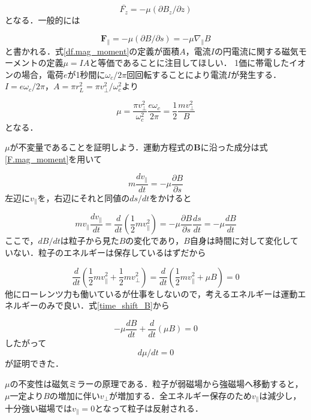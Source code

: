 \documentclass{ltjsarticle}
\numberwithin{equation}{section} %
\numberwithin{equation}{section}
\begin{document}
\begin{equation}
  \bar{F_z} = -\mu (\partial B_z / \partial z)
\end{equation}
となる．一般的には

\begin{equation}
  \bm{F}_\parallel = -\mu (\partial B /\partial s) = -\mu \nabla_\parallel B \label{F.mag_moment}
\end{equation}
と書かれる．式\eqref{df.mag_moment}の定義が面積$A$，電流$I$の円電流に関する磁気モーメントの定義$\mu= IA$と等価であることに注目してほしい．
1価に帯電したイオンの場合，電荷$e$が1秒間に$\omega_c/2\pi$回回転することにより電流$I$が発生する．$I=e\omega_c/2\pi$，$A=\pi r_L ^2 = \pi v_\perp ^2/\omega_c ^2$より

\[
 \mu = \frac{\pi v_\perp ^2}{\omega_c ^2}\frac{e\omega_c}{2\pi} = \frac{1}{2}\frac{mv_\perp ^2}{B}
\]
となる．

$\mu$が不変量であることを証明しよう．運動方程式の$\bm{B}$に沿った成分は式\eqref{F.mag_moment}を用いて

\begin{equation}
  m\frac{dv_\parallel}{dt} = -\mu \frac{\partial B}{\partial s}
\end{equation}
左辺に$v_\parallel$を，右辺にそれと同値の$ds/dt$をかけると

\begin{equation}
  mv_\parallel \frac{dv_\parallel}{dt} = \frac{d}{dt}\left(\frac{1}{2}mv_\parallel ^2\right) = -\mu \frac{\partial B}{\partial s}\frac{ds}{dt} = -\mu \frac{dB}{dt} \label{time_shift_B}
\end{equation}
ここで，$dB/dt$は粒子から見た$B$の変化であり，$B$自身は時間に対して変化していない．粒子のエネルギーは保存しているはずだから

\begin{equation}
  \frac{d}{dt}\left(\frac{1}{2}mv_\parallel ^2 + \frac{1}{2}mv_\perp ^2\right) = \frac{d}{dt}\left(\frac{1}{2}mv_\parallel ^2 + \mu B\right) = 0
\end{equation}
他にローレンツ力も働いているが仕事をしないので，考えるエネルギーは運動エネルギーのみで良い．式\eqref{time_shift_B}から

\[
 -\mu \frac{dB}{dt} + \frac{d}{dt}(\mu B) = 0
\]
したがって
\begin{equation}
  d\mu/dt = 0
\end{equation}
が証明できた．

$\mu$の不変性は磁気ミラーの原理である．粒子が弱磁場から強磁場へ移動すると，$\mu$一定より$B$の増加に伴い$v_\perp$が増加する．全エネルギー保存のため$v_\parallel$は減少し，十分強い磁場では$v_\parallel=0$となって粒子は反射される．
\end{document}
